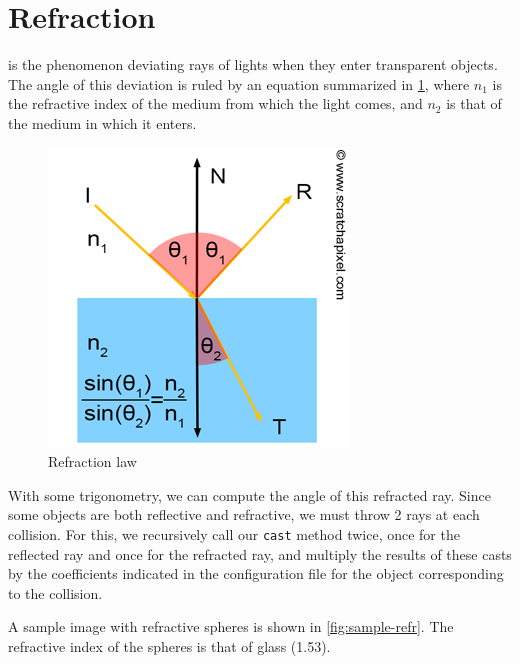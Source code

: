 \documentclass[a4paper,12pt,journal,twoside,compsoc]{PPIEEEtran}
\begin{document}
\section{Refraction}
is the phenomenon deviating rays of lights when they enter
transparent objects.  The angle of this deviation is ruled by an equation
summarized in \cref{fig:refr}, where $n_1$ is the refractive index of the medium
from which the light comes, and $n_2$ is that of the medium in which it enters.
\begin{figure}
  \begin{center}
    \includegraphics[width=0.7\linewidth]{refraction.png}
  \end{center}
  \caption{Refraction law}
  \label{fig:refr}
\end{figure}

With some trigonometry, we can compute the angle of this refracted ray.  Since
some objects are both reflective and refractive, we must throw 2 rays at each
collision.  For this, we recursively call our \texttt{cast} method twice, once
for the reflected ray and once for the refracted ray, and multiply the results
of these casts by the coefficients indicated in the configuration file for the
object corresponding to the collision.

A sample image with refractive spheres is shown in \cref{fig:sample-refr}.  The
refractive index of the spheres is that of glass (1.53).
\end{document}
